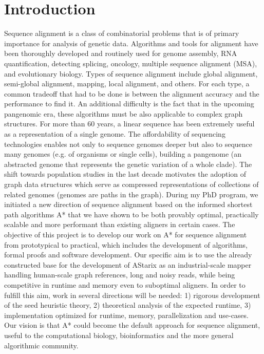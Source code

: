 \chapter{Introduction}

\graphicspath{{\dir/}}

Sequence alignment is a class of combinatorial problems that is of primary
importance for analysis of genetic data. Algorithms and tools for alignment have
been thoroughly developed and routinely used for genome assembly, RNA
quantification, detecting splicing, oncology, multiple sequence alignment (MSA),
and evolutionary biology. Types of sequence alignment include global alignment,
semi-global alignment, mapping, local alignment, and others. For each type, a
common tradeoff that had to be done is between the alignment accuracy and the
performance to find it. An additional difficulty is the fact that in the
upcoming pangenomic era, these algorithms must be also applicable to complex
graph structures. For more than 60 years, a linear sequence has been extremely
useful as a representation of a single genome. The affordability of sequencing
technologies enables not only to sequence genomes deeper but also to sequence
many genomes (e.g. of organisms or single cells), building a pangenome (an
abstracted genome that represents the genetic variation of a whole clade). The
shift towards population studies in the last decade motivates the adoption of
graph data structures which serve as compressed representations of collections
of related genomes (genomes are paths in the graph). During my PhD program, we
initiated a new direction of sequence alignment based on the informed shortest
path algorithms A* that we have shown to be both provably optimal, practically
scalable and more performant than existing aligners in certain cases. The
objective of this project is to develop our work on A* for sequence alignment
from prototypical to practical, which includes the development of algorithms,
formal proofs and software development. Our specific aim is to use the already
constructed base for the development of AStarix as an industrial-scale mapper
handling human-scale graph references, long and noisy reads, while being
competitive in runtime and memory even to suboptimal aligners. In order to
fulfill this aim, work in several directions will be needed: 1) rigorous
development of the seed heuristic theory, 2) theoretical analysis of the
expected runtime, 3) implementation optimized for runtime, memory,
parallelization and use-cases. Our vision is that A* could become the default
approach for sequence alignment, useful to the computational biology,
bioinformatics and the more general algorithmic community.


